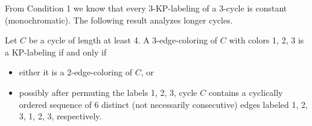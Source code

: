 \documentclass[12pt,a4paper,titlepage,openany]{report}
\begin{document}
\begin{sloppypar}
From Condition 1 we know that every 3-KP-labeling of a 3-cycle is constant (monochromatic). The following result analyzes longer cycles.
\end{sloppypar}

\begin{lemma}\label{123123}
Let $C$ be a cycle of length at least 4. A 3-edge-coloring of $C$ with colors 1, 2, 3 is a KP-labeling if and only if
\begin{itemize}
\item either it is a 2-edge-coloring of $C$, or
\item possibly after permuting the labels 1, 2, 3, cycle $C$ contains a cyclically ordered sequence
of 6 distinct (not necessarily consecutive) edges labeled 1, 2, 3, 1, 2, 3, respectively.
\end{itemize}
\end{lemma}
\end{document}
